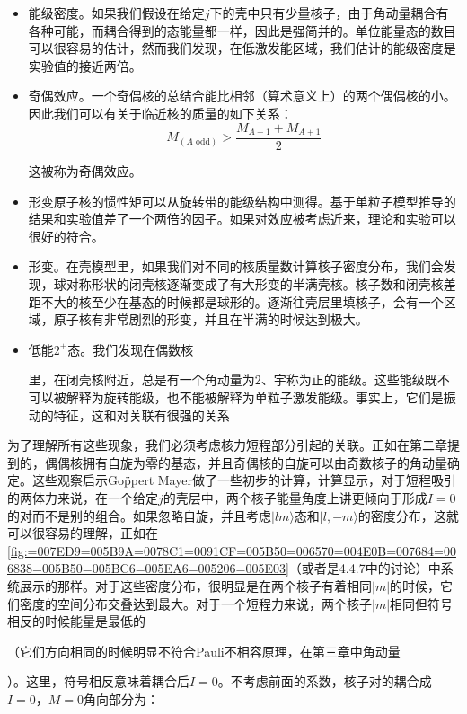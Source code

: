 \begin{itemize}
\item 能级密度。如果我们假设在给定$j$下的壳中只有少量核子，由于角动量耦合有各种可能，而耦合得到的态能量都一样，因此是强简并的。单位能量态的数目可以很容易的估计，然而我们发现，在低激发能区域，我们估计的能级密度是实验值的接近两倍。
\item 奇偶效应。一个奇偶核的总结合能比相邻（算术意义上）的两个偶偶核的小。因此我们可以有关于临近核的质量的如下关系：
\[
M_{(A\text{ odd})}>\frac{M_{A-1}+M_{A+1}}{2}
\]

这被称为奇偶效应。
\item 形变原子核的惯性矩可以从旋转带的能级结构中测得。基于单粒子模型推导的结果和实验值差了一个两倍的因子。如果对效应被考虑近来，理论和实验可以很好的符合。
\item 形变。在壳模型里，如果我们对不同的核质量数计算核子密度分布，我们会发现，球对称形状的闭壳核逐渐变成了有大形变的半满壳核。核子数和闭壳核差距不大的核至少在基态的时候都是球形的。逐渐往壳层里填核子，会有一个区域，原子核有非常剧烈的形变，并且在半满的时候达到极大。
\item 低能$2^{+}$态。我们发现在偶数核

里，在闭壳核附近，总是有一个角动量为$2$、宇称为正的能级。这些能级既不可以被解释为旋转能级，也不能被解释为单粒子激发能级。事实上，它们是振动的特征，这和对关联有很强的关系
\end{itemize}
为了理解所有这些现象，我们必须考虑核力短程部分引起的关联。正如在第二章提到的，偶偶核拥有自旋为零的基态，并且奇偶核的自旋可以由奇数核子的角动量确定。这些观察启示Go\"ppert
Mayer\cite{Ma50}做了一些初步的计算，计算显示，对于短程吸引的两体力来说，在一个给定$j$的壳层中，两个核子能量角度上讲更倾向于形成$I=0$的对而不是别的组合。如果忽略自旋，并且考虑$|lm\rangle$态和$|l,-m\rangle$的密度分布，这就可以很容易的理解，正如在\ref{fig:=007ED9=005B9A=0078C1=0091CF=005B50=006570=004E0B=007684=006838=005B50=005BC6=005EA6=005206=005E03}（或者是4.4.7中的讨论）中系统展示的那样。对于这些密度分布，很明显是在两个核子有着相同$|m|$的时候，它们密度的空间分布交叠达到最大。对于一个短程力来说，两个核子$\left|m\right|$相同但符号相反的时候能量是最低的

（它们方向相同的时候明显不符合Pauli不相容原理，在第三章中角动量

）。这里，符号相反意味着耦合后$I=0$。不考虑前面的系数，核子对的耦合成$I=0$，$M=0$角向部分为：

